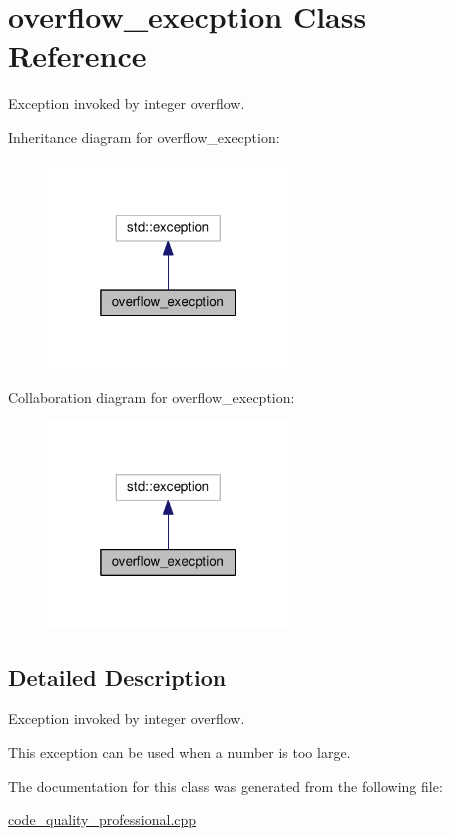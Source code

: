 \hypertarget{classoverflow__execption}{}\section{overflow\+\_\+execption Class Reference}
\label{classoverflow__execption}


Exception invoked by integer overflow.  




Inheritance diagram for overflow\+\_\+execption\+:\nopagebreak
\begin{figure}[H]
\begin{center}
\leavevmode
\includegraphics[width=181pt]{classoverflow__execption__inherit__graph}
\end{center}
\end{figure}


Collaboration diagram for overflow\+\_\+execption\+:\nopagebreak
\begin{figure}[H]
\begin{center}
\leavevmode
\includegraphics[width=181pt]{classoverflow__execption__coll__graph}
\end{center}
\end{figure}


\subsection{Detailed Description}
Exception invoked by integer overflow. 

This exception can be used when a number is too large. 

The documentation for this class was generated from the following file\+:\begin{DoxyCompactItemize}
\item 
\hyperlink{code__quality__professional_8cpp}{code\+\_\+quality\+\_\+professional.\+cpp}\end{DoxyCompactItemize}
